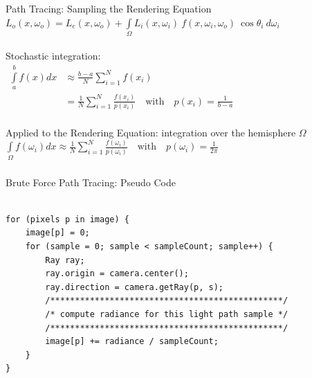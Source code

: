 \documentclass[utf8,stillsansserifmath,fleqn,t]{beamer}
\newcommand{\ds}{\displaystyle}
\begin{document}
\begin{frame}[label=path-tracing-brute-force-stochastic]
\frametitle{\insertsection}
Path Tracing: Sampling the Rendering Equation\\
$\displaystyle L_o(x, \omega_o) = L_e(x, \omega_o) + \int\limits_\Omega
    L_i(x,\omega_i)~f(x,\omega_i,\omega_o)~\cos\theta_i~d\omega_i$\\
~\\
Stochastic integration:\\
$\ds\begin{aligned}
    \int\limits_a^b f(x)dx &\approx \frac{b-a}{N} \sum\limits_{i=1}^N f(x_i)\\
    &=\frac{1}{N}\sum\limits_{i=1}^N \frac{f(x_i)}{p(x_i)}\quad\text{with}\quad
    p(x_i)=\frac{1}{b-a}\end{aligned}$\\
~\\
Applied to the Rendering Equation: integration over the hemisphere $\Omega$\\
$\ds \int\limits_\Omega f(\omega_i)dx \approx
\frac{1}{N}\sum\limits_{i=1}^N
     \frac{f(\omega_i)}{p(\omega_i)}\quad\text{with}\quad
     p(\omega_i)=\frac{1}{2\pi}$\\
\end{frame}

\begin{frame}[fragile]
\frametitle{\insertsection}
Brute Force Path Tracing: Pseudo Code\\~\\
\begin{lstlisting}
for (pixels p in image) {
    image[p] = 0;
    for (sample = 0; sample < sampleCount; sample++) {
        Ray ray;
        ray.origin = camera.center();
        ray.direction = camera.getRay(p, s);
        /***********************************************/
        /* compute radiance for this light path sample */
        /***********************************************/
        image[p] += radiance / sampleCount;
    }
}
\end{lstlisting}
\end{frame}
\end{document}

